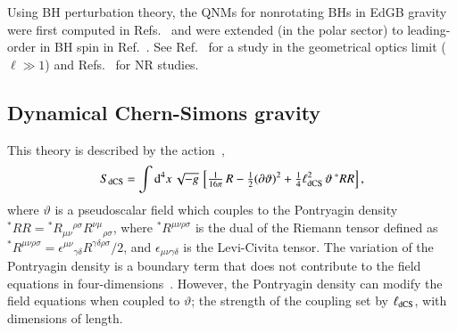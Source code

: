 \documentclass[twocolumn,
               prd,
               aps,
               superscriptaddress,
               tightenlines,
               nofootinbib,
               eqsecnum,
               amsfonts,
               amsmath,
               longbibliography]{revtex4-1}
\newcommand{\dV}{{\rm d}^{4}x \, \sqrt{-g} \,}
\begin{document}
Using BH perturbation theory, the QNMs for nonrotating BHs in EdGB gravity
were first computed in Refs.~\cite{Pani:2009wy,Blazquez-Salcedo:2016enn}
and were extended (in the polar sector) to leading-order in BH spin in Ref.~\cite{Pierini:2021jxd}.
%
See Ref.~\cite{Bryant:2021xdh} for a study in the geometrical optics limit ($\ell \gg 1$) and
Refs.~\cite{Witek:2018dmd,Okounkova:2019zep} for NR studies.

\subsection{Dynamical Chern-Simons gravity}
\label{sec:review_dcs}

This theory is described by the action~\cite{Jackiw:2003pm,Alexander:2009tp},
%
\begin{align} \label{eq:action_dcs}
    S_{\rm dCS} =
    \int \dV
    \left[
    \tfrac{1}{16\pi}\, R - \tfrac{1}{2}(\partial \vartheta)^2
    + \tfrac{1}{4} \ell^{2}_{\rm dCS} \, \vartheta \, {}^{*}RR
    \right],
\end{align}
%
where $\vartheta$ is a pseudoscalar field which couples to the Pontryagin
density
${}^{*}RR = {}^{*}R_{\mu\nu}{}^{\rho\sigma} R^{\nu\mu}{}_{\rho\sigma}$,
%
where ${}^{*}R^{\mu\nu\rho\sigma}$ is the dual of the Riemann tensor
defined as
%
${}^{*}R^{\mu\nu\rho\sigma} =
\epsilon^{\mu\nu}{}_{\gamma\delta}
R^{\gamma\delta\rho\sigma} / 2$,
%
and $\epsilon_{\mu\nu\gamma\delta}$ is the Levi-Civita tensor.
%
The variation of the Pontryagin density is a boundary
term that does not contribute to the field equations in
four-dimensions~\cite{Jackiw:2003pm}.
%
However, the Pontryagin density can modify the field equations when coupled to $\vartheta$;
the strength of the coupling set by $\ell_{\rm dCS}$, with dimensions of length.
%
\end{document}
